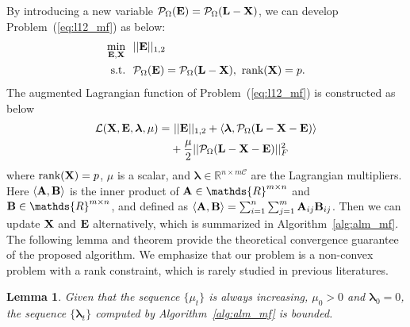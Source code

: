 \documentclass[letterpaper]{article} %
\newtheorem{lemma}{Lemma}
\def\calP{\mathcal{P}}
\def\bB{{\bf B}}
\def\bE{{\bf E}}
\def\blambda{{\bm \lambda}}
\def\calL{{\mathcal{L}}}
\def\calC{{\mathcal{C}}}
\def\bL{{\bf L}}
\def\dsR{\mathds{R}}
\def\bX{{\bf X}}
\def\bA{{\bf A}}
\def\bX{{\bf X}}
\def\st{{\text{s.t.}}}
\def\rank{{\text{rank}}}
\begin{document}
By introducing a new variable $\calP_{\Omega} (\bE) = \calP_{\Omega} (\bL - \bX)$, we can develop Problem~(\ref{eq:l12_mf}) as below:
{\small
\begin{align}\label{eq:mf_l21_constrained}
  \min_{\bE, \bX} ~&~ || \bE ||_{1,2}      \nonumber \\
  \st             ~&~ \calP_{\Omega} (\bE) = \calP_{\Omega} (\bL - \bX)  ,~ \rank(\bX) = p  .
\end{align}
}
\noindent
The augmented Lagrangian function of Problem~(\ref{eq:l12_mf}) is constructed as below
{\small
\begin{align}\label{eq:lagrangian_l21}
  \calL (\bX, \bE, \blambda, \mu) = &~ || \bE ||_{1,2} + \langle \blambda, \calP_{\Omega} (\bL - \bX - \bE) \rangle      \nonumber \\
                                    & + \frac{\mu}{2} || \calP_{\Omega} (\bL - \bX - \bE) ||_F^2
\end{align}
}
\noindent
where $\rank (\bX) = p$, $\mu$ is a scalar,
and $\blambda \in \dsR^{n \times m\calC}$ are the Lagrangian multipliers.
Here $\langle \bA, \bB \rangle$ is the inner product of $\bA \in \dsR^{m \times n}$ and $\bB \in \dsR^{m \times n}$, and defined as $\langle \bA, \bB \rangle = \sum_{i=1}^{n} \sum_{j=1}^{m} \bA_{ij} \bB_{ij}$.
Then we can update $\bX$ and $\bE$ alternatively, which is summarized in Algorithm~\ref{alg:alm_mf}.
The following lemma and theorem provide the theoretical convergence guarantee of the proposed algorithm.
We emphasize that our problem is a non-convex problem with a rank constraint, which is rarely studied in previous literatures.


\begin{lemma}
Given that the sequence $\{ \mu_{t} \}$ is always increasing, $\mu_{0} > 0$ and $\blambda_{0} = 0$, the sequence $\{ \blambda_{t} \}$ computed by Algorithm~\ref{alg:alm_mf} is bounded.
\end{lemma}
\end{document}
